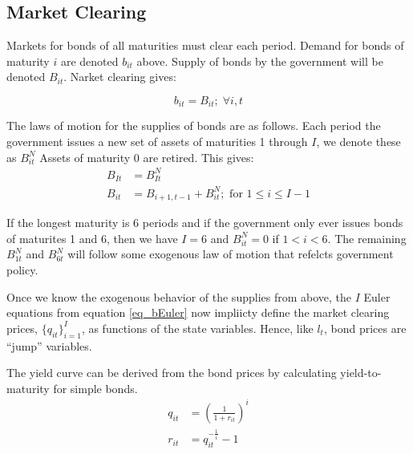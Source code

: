 \documentclass[letterpaper,11pt]{article}
\theoremstyle{definition}
\numberwithin{equation}{section}
\begin{document}
\begin{spacing}{1.5}
	\subsection{Market Clearing}

		Markets for bonds of all maturities must clear each period.  Demand for bonds of maturity $i$ are denoted $b_{it}$ above.  Supply of bonds by the government will be denoted $B_{it}$.  Narket clearing gives:

		\begin{equation}
			b_{it} = B_{it}; \; \forall i, t
		\end{equation}
		
		The laws of motion for the supplies of bonds are as follows.  Each period the government issues a new set of assets of maturities 1 through $I$, we denote these as $B^N_{it}$  Assets of maturity 0 are retired.  This gives:
		\begin{align}
			B_{It} & = B^N_{It} \\
			B_{it} & = B_{i+1,t-1} + B^N_{it}; \text{ for } 1 \le i \le I-1
		\end{align}

		If the longest maturity is 6 periods and if the government only ever issues bonds of maturites 1 and 6, then we have $I=6$ and $B^N_{it} = 0$ if $1 < i < 6$.  The remaining $B^N_{1t}$ and $B^N_{6t}$ will follow some exogenous law of motion that refelcts government policy.

		Once we know the exogenous behavior of the supplies from above, the $I$ Euler equations from equation \eqref{eq_bEuler} now impliicty define the market clearing prices, $\{ q_{it} \}_{i=1}^I$, as functions of the state variables.  Hence, like $l_t$, bond prices are ``jump'' variables.

		The yield curve can be derived from the bond prices by calculating yield-to-maturity for simple bonds.
		\begin{align}
			q_{it} & = \left( \frac{1}{1+r_{it}} \right)^i \nonumber \\
			r_{it} & = q_{it}^{-\frac{1}{i}} - 1
		\end{align}
		

\end{spacing}
\end{document}
